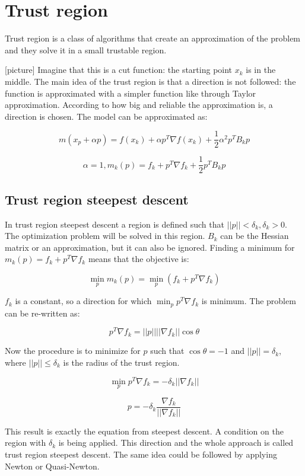 \section{Trust region}
Trust region is a class of algorithms that create an approximation of the problem and they solve it in a small trustable region.

{[}picture{]}
\noindent
Imagine that this is a cut function: the starting point $x_k$ is in the middle.
The main idea of the trust region is that a direction is not followed: the function is approximated  with a simpler function like through Taylor approximation.
According to how big and reliable the approximation is, a direction is chosen.
The model can be approximated as:

$$m(x_p+\alpha p)=f(x_k)+\alpha p^T \nabla f(x_k)+ \frac{1}{2} \alpha^2p^T B_k p$$

$$\alpha=1, m_k (p)=f_k+p^T\nabla f_k + \frac{1}{2} p^T B_k p$$

  \subsection{Trust region steepest descent}
  In trust region steepest descent a region is defined such that $||p|| < \delta_k,\delta_k>0$.
  The optimization problem will be solved in this region.
  $B_k$ can be the Hessian matrix or an approximation, but it can also be ignored.
  Finding a minimum for $m_k(p)=f_k+p^T\nabla f_k$ means that the objective is:

  $$\min_p m_k(p)= \min_p (f_k+p^T\nabla f_k)$$

  $f_k$ is a constant, so a direction for which $\min_p p^T\nabla f_k$ is minimum.
  The problem can be re-written as:

  $$p^T\nabla f_k = ||p|| ||\nabla f_k|| \cos \theta$$

  Now the procedure is to minimize for $p$ such that $\cos \theta = -1$ and $||p||=\delta_k$,
  where $||p|| \leq \delta_k$ is the radius of the trust region.

  $$\min_p p^T\nabla f_k = -\delta_k || \nabla f_k ||$$

  $$p = - \delta_k \frac{\nabla f_k}{||\nabla f_k||}$$

  This result is exactly the equation from steepest descent.
  A condition on the region with $\delta_k$ is being applied.
  This direction and the whole approach is called trust region steepest descent.
  The same idea could be followed by applying Newton or Quasi-Newton.

